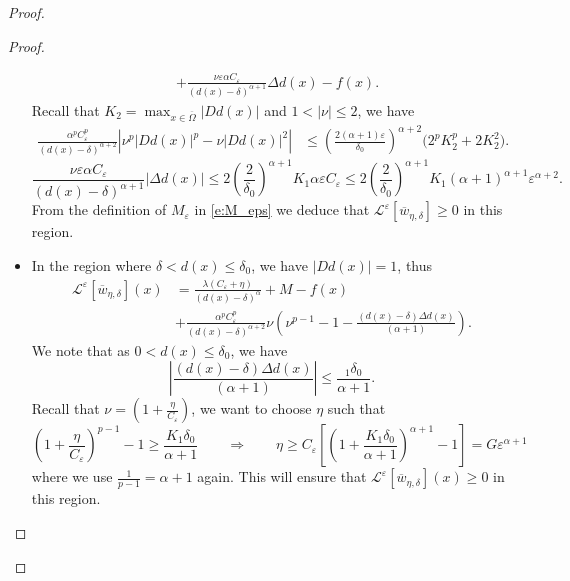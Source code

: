 \documentclass[11pt,reqno]{amsart}
\numberwithin{figure}{section}
\theoremstyle{plain}
\theoremstyle{remark}
\numberwithin{equation}{section}
\begin{document}
\begin{proof}
\begin{proof}
\begin{itemize}
\begin{align*}
        &+\frac{\nu\varepsilon \alpha C_\varepsilon}{(d(x)-\delta)^{\alpha+1}}\Delta d(x) - f(x).
    \end{align*}
Recall that $K_2 = \max_{x\in\overline{\Omega}}|Dd(x)|$ and $1<|\nu|\leq 2$, we have
\begin{align*}
    \frac{\alpha^pC_\varepsilon^p}{(d(x)-\delta)^{\alpha+2}}\left|\nu^{p}|Dd(x)|^p - \nu|Dd(x)|^2\right| &\leq \left(\frac{2(\alpha+1)\varepsilon}{\delta_0}\right)^{\alpha+2}\big(2^pK_2^p+2K_2^2\big).
\end{align*}
\begin{equation*}
    \frac{\nu\varepsilon \alpha C_\varepsilon}{(d(x)-\delta)^{\alpha+1}}|\Delta d(x)| \leq 2\left(\frac{2}{\delta_0}\right)^{\alpha+1}K_1 \alpha\varepsilon C_\varepsilon \leq 2\left(\frac{2}{\delta_0}\right)^{\alpha+1}K_1 (\alpha+1)^{\alpha+1}\varepsilon^{\alpha+2}.
\end{equation*}
 From the definition of $M_\varepsilon$ in \eqref{e:M_eps} we deduce that $\mathcal{L}^\varepsilon\left[\overline{w}_{\eta,\delta}\right]\geq 0$ in this region.
    \item In the region where $\delta < d(x)\leq \delta_0$, we have $|Dd(x)|=1$, thus
    \begin{align*}
         \mathcal{L}^\varepsilon\left[\overline{w}_{\eta,\delta}\right](x) &= \frac{\lambda(C_\varepsilon + \eta)}{(d(x)-\delta)^\alpha} + M - f(x)\\
         & + \frac{\alpha^p C_\varepsilon^p}{(d(x)-\delta)^{\alpha+2}}\nu\left(\nu^{p-1} - 1 - \frac{ (d(x)-\delta)\Delta d(x)}{(\alpha+1)}\right).
    \end{align*}
    We note that as $0<d(x)\leq \delta_0$, we have
    \begin{equation*}
        \left|\frac{(d(x)-\delta)\Delta  d(x)}{(\alpha+1)}\right| \leq \frac{_1\delta_0}{\alpha+1}.
    \end{equation*}
    Recall that $\nu = \left(1+\frac{\eta}{C_\varepsilon}\right)$, we want to choose $\eta$ such that
    \begin{equation*}
        \left(1+\frac{\eta}{C_\varepsilon}\right)^{p-1} - 1 \geq \frac{K_1\delta_0}{\alpha+1} \qquad\Longrightarrow\qquad \eta \geq C_\varepsilon\left[\left(1+\frac{K_1\delta_0}{\alpha+1}\right)^{\alpha+1}-1\right] = G\varepsilon^{\alpha+1}
    \end{equation*}
    where we use $\frac{1}{p-1} = \alpha+1$ again. This will ensure that $\mathcal{L}^\varepsilon\left[\overline{w}_{\eta,\delta}\right](x) \geq 0$ in this region.
\end{itemize}
\end{proof}


\end{proof}
\end{document}
